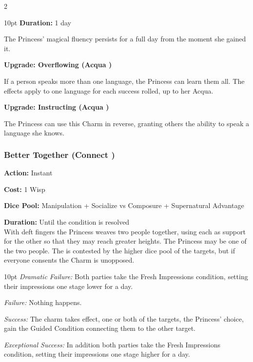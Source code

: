 \begin{multicols}{2}
\begin{myindentpar}{10pt}
\noindent \textbf{Duration:} 1 day

The Princess' magical fluency persists for a full day from the moment she gained it.

\textbf{Upgrade: Overflowing (Acqua \textbullet\textbullet)}

If a person speaks more than one language, the Princess can learn them all. The effects apply to one language for each success rolled, up to her Acqua.

\textbf{Upgrade: Instructing (Acqua \textbullet\textbullet)}

The Princess can use this Charm in reverse, granting others the ability to speak a language she knows. 

\end{myindentpar}

\subsubsection*{Better Together (Connect \textbullet\textbullet)}

\noindent \textbf{Action:} Instant

\noindent \textbf{Cost:} 1 Wisp

\noindent \textbf{Dice Pool:} Manipulation + Socialize vs Composure + Supernatural Advantage

\noindent \textbf{Duration:} Until the condition is resolved \\

\noindent With deft fingers the Princess weaves two people together, using each as support for the other so that they may reach greater heights. The Princess may be one of the two people. The is contested by the higher dice pool of the targets, but if everyone consents the Charm is unopposed. 

\begin{myindentpar}{10pt}
    \emph{Dramatic Failure:} Both parties take the Fresh Impressions condition, setting their impressions one stage lower for a day. 
    
    \emph{Failure:} Nothing happens. 
    
    \emph{Success:} The charm takes effect, one or both of the targets, the Princess' choice, gain the Guided Condition connecting them to the other target.
    
    \emph{Exceptional Success:} In addition both parties take the Fresh Impressions condition, setting their impressions one stage higher for a day. 
\end{myindentpar}


\end{multicols}
